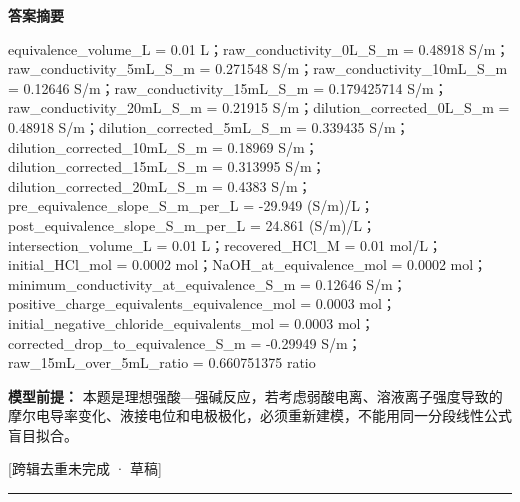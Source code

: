 \documentclass[UTF8,11pt,a4paper]{ctexart}
\begin{document}
\noindent\textbf{答案摘要}\par
equivalence\_volume\_L = 0.01 L；raw\_conductivity\_0L\_S\_m = 0.48918 S/m；raw\_conductivity\_5mL\_S\_m = 0.271548 S/m；raw\_conductivity\_10mL\_S\_m = 0.12646 S/m；raw\_conductivity\_15mL\_S\_m = 0.179425714 S/m；raw\_conductivity\_20mL\_S\_m = 0.21915 S/m；dilution\_corrected\_0L\_S\_m = 0.48918 S/m；dilution\_corrected\_5mL\_S\_m = 0.339435 S/m；dilution\_corrected\_10mL\_S\_m = 0.18969 S/m；dilution\_corrected\_15mL\_S\_m = 0.313995 S/m；dilution\_corrected\_20mL\_S\_m = 0.4383 S/m；pre\_equivalence\_slope\_S\_m\_per\_L = -29.949 (S/m)/L；post\_equivalence\_slope\_S\_m\_per\_L = 24.861 (S/m)/L；intersection\_volume\_L = 0.01 L；recovered\_HCl\_M = 0.01 mol/L；initial\_HCl\_mol = 0.0002 mol；NaOH\_at\_equivalence\_mol = 0.0002 mol；minimum\_conductivity\_at\_equivalence\_S\_m = 0.12646 S/m；positive\_charge\_equivalents\_equivalence\_mol = 0.0003 mol；initial\_negative\_chloride\_equivalents\_mol = 0.0003 mol；corrected\_drop\_to\_equivalence\_S\_m = -0.29949 S/m；raw\_15mL\_over\_5mL\_ratio = 0.660751375 ratio\par
\noindent\textbf{模型前提：}
本题是理想强酸—强碱反应，若考虑弱酸电离、溶液离子强度导致的摩尔电导率变化、液接电位和电极极化，必须重新建模，不能用同一分段线性公式盲目拟合。\par
\noindent\textcolor{red!65!black}{[跨辑去重未完成 · 草稿]} \par
\medskip\hrule\medskip
{}
\end{document}
